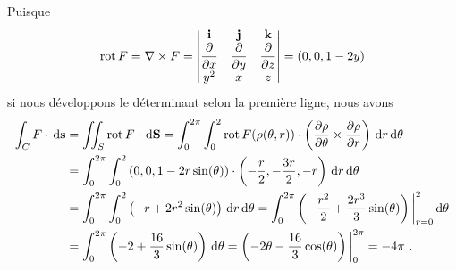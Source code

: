 {Puisque
\[
\operatorname{rot} F = \nabla \times F
= \begin{vmatrix}
\mathbf{i} & \mathbf{j} & \mathbf{k} \\
\displaystyle \frac{\partial }{\partial x} & \displaystyle \frac{\partial }{\partial y} &
\displaystyle \frac{\partial }{\partial z} \\
y^2 & x & z
\end{vmatrix}
= \left( 0, 0, 1 - 2y \right)
\]
si nous développons le déterminant selon la première ligne, nous avons
\begin{align*}
\int_C F \cdot \,\mathrm{d}\mathbf{s}
&= \iint_S \operatorname{rot}  F \cdot \,\mathrm{d}\mathbf{S}
= \int_0^{2\pi}\int_0^2 \operatorname{rot}  F(\rho(\theta,r)) \cdot
\left(\frac{\partial \rho}{\partial \theta} \times \frac{\partial \rho}{\partial r}\right)
\,\mathrm{d}r\,\mathrm{d}\theta \\
&=\int_0^{2\pi}\int_0^2 \left( 0, 0, 1 - 2r\sin(\theta)\right)
 \cdot \left(-\frac{r}{2}, -\frac{3r}{2},-r\right) \,\mathrm{d}r\,\mathrm{d}\theta \\
&= \int_0^{2\pi}\int_0^2 \left(-r + 2r^2\sin(\theta)\right) \,\mathrm{d}r\,\mathrm{d}\theta
= \int_0^{2\pi} \left(-\frac{r^2}{2}
+ \frac{2r^3}{3}\sin(\theta) \right)\bigg|_{r=0}^2\,\mathrm{d}\theta \\
& = \int_0^{2\pi} \left( -2 + \frac{16}{3} \sin(\theta)\right)\,\mathrm{d}\theta
= \left( -2\theta - \frac{16}{3} \cos(\theta)\right)\bigg|_0^{2\pi} 
= - 4 \pi \ .
\end{align*}
}

